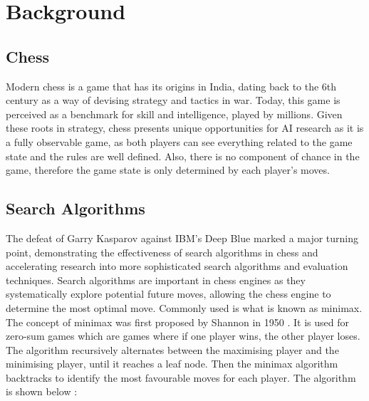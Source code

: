 \chapter{Background}
\section{Chess}
Modern chess is a game that has its origins in India, dating back to the 6th century \cite{averbakhHistoryChessChaturanga2012} as a way of devising strategy and tactics in war. Today, this game is perceived as a benchmark for skill and intelligence, played by millions. Given these roots in strategy, chess presents unique opportunities for AI research as it is a fully observable game, as both players can see everything related to the game state and the rules are well defined. Also, there is no component of chance in the game, therefore the game state is only determined by each player's moves.


\section{Search Algorithms}

The defeat of Garry Kasparov against IBM's Deep Blue marked a major turning point, demonstrating the effectiveness of search algorithms in chess and accelerating research into more sophisticated search algorithms and evaluation techniques. Search algorithms are important in chess engines as they systematically explore potential future moves, allowing the chess engine to determine the most optimal move. Commonly used is what is known as minimax. The concept of minimax was first proposed by Shannon in 1950 \cite{shannonXXIIProgrammingComputer1950}.
It is used for zero-sum games which are games where if one player wins, the other player loses. The algorithm recursively alternates between the maximising player and the minimising player, until it reaches a leaf node. Then the minimax algorithm backtracks to identify the most favourable moves for each player. The algorithm is shown below \cite{russellArtificialIntelligenceModern2022}:


